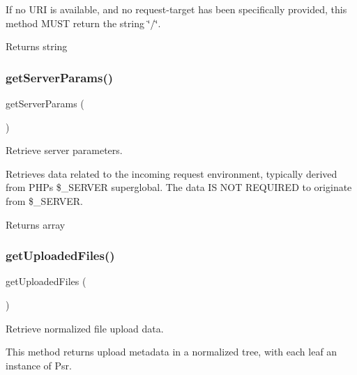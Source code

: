 If no U\+RI is available, and no request-\/target has been specifically provided, this method M\+U\+ST return the string \char`\"{}/\char`\"{}.

\begin{DoxyReturn}{Returns}
string 
\end{DoxyReturn}
\mbox{\label{class_pes_1_1_http_1_1_request_abe2174960ca9d241f83fabd7d2dd8e84}} 
\subsubsection{\texorpdfstring{get\+Server\+Params()}{getServerParams()}}
{\footnotesize\ttfamily get\+Server\+Params (\begin{DoxyParamCaption}{ }\end{DoxyParamCaption})}

Retrieve server parameters.

Retrieves data related to the incoming request environment, typically derived from P\+HP\textquotesingle{}s \$\+\_\+\+S\+E\+R\+V\+ER superglobal. The data IS N\+OT R\+E\+Q\+U\+I\+R\+ED to originate from \$\+\_\+\+S\+E\+R\+V\+ER.

\begin{DoxyReturn}{Returns}
array 
\end{DoxyReturn}
\mbox{\label{class_pes_1_1_http_1_1_request_a37e4a06ea2cd48bddfd2d86e127394c6}} 
\subsubsection{\texorpdfstring{get\+Uploaded\+Files()}{getUploadedFiles()}}
{\footnotesize\ttfamily get\+Uploaded\+Files (\begin{DoxyParamCaption}{ }\end{DoxyParamCaption})}

Retrieve normalized file upload data.

This method returns upload metadata in a normalized tree, with each leaf an instance of Psr.

